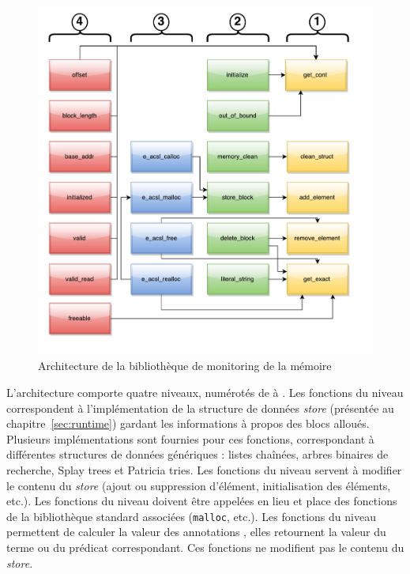 \begin{figure}[h!]
  \centering
  \includegraphics[scale=.55]{figures/mmodel_architecture.pdf}
  \vspace{-.8cm}
  \caption{Architecture de la bibliothèque de monitoring de la mémoire
    \label{fig:mmodel-architecture}}
\end{figure}

L'architecture comporte quatre niveaux, numérotés de  à .
Les fonctions du niveau  correspondent à l'implémentation de la
structure de données {\em store} (présentée au chapitre~\ref{sec:runtime})
gardant les informations à propos des blocs alloués.
Plusieurs implémentations sont fournies pour ces fonctions, correspondant à
différentes structures de données génériques : listes chaînées, arbres binaires
de recherche, Splay trees et Patricia tries.
Les fonctions du niveau  servent à modifier le contenu du {\em store}
(ajout ou suppression d'élément, initialisation des éléments, etc.).
Les fonctions du niveau  doivent être appelées en lieu et place des
fonctions de la bibliothèque standard associées (\lstinline'malloc', etc.).
Les fonctions du niveau  permettent de calculer la valeur des
annotations \eacsl, elles retournent la valeur du terme ou du prédicat \eacsl
correspondant.
Ces fonctions ne modifient pas le contenu du {\em store}.

